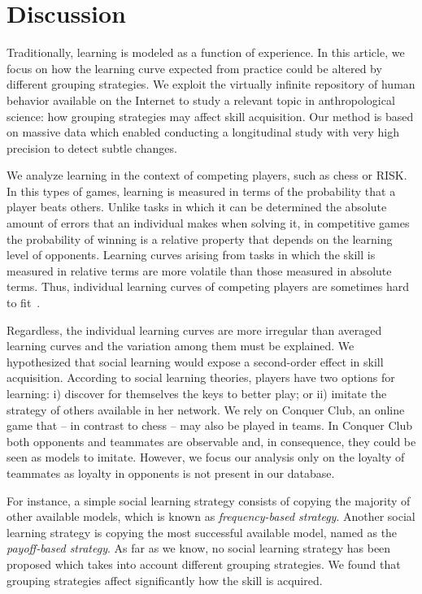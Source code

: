 \documentclass[a4paper,10pt]{book}
\theoremstyle{definition}
\begin{document}
\section{Discussion}

Traditionally, learning is modeled as a function of experience. 
In this article, we focus on how the learning curve expected from practice could be altered by different grouping strategies.
We exploit the virtually infinite repository of human behavior available on the Internet to study a relevant topic in anthropological science: how grouping strategies may affect skill acquisition.
Our method is based on massive data which enabled conducting a longitudinal study with very high precision to detect subtle changes.

We analyze learning in the context of competing players, such as chess or RISK.
In this types of games, learning is measured in terms of the probability that a player beats others.
Unlike tasks in which it can be determined the absolute amount of errors that an individual makes when solving it, in competitive games the probability of winning is a relative property that depends on the learning level of opponents.
Learning curves arising from tasks in which the skill is measured in relative terms are more volatile than those measured in absolute terms.
Thus, individual learning curves of competing players are sometimes hard to fit~\cite{howard2014-learningCurvesChessPlayersATestOfPowerLawGenerality,gaschler2014-playingOffThePredictedLearningCurve}.

Regardless, the individual learning curves are more irregular than averaged learning curves and the variation among them must be explained.
We hypothesized that social learning would expose a second-order effect in skill acquisition.
According to social learning theories, players have two options for learning: i) discover for themselves the keys to better play; or ii) imitate the strategy of others available in her network.
We rely on Conquer Club, an online game that -- in contrast to chess -- may also be played in teams.
In Conquer Club both opponents and teammates are observable and, in consequence, they could be seen as models to imitate.
However, we focus our analysis only on the loyalty of teammates as loyalty in opponents is not present in our database.

For instance, a simple social learning strategy consists of copying the majority of other available models, which is known as \emph{frequency-based strategy}.
Another social learning strategy is copying the most successful available model, named as the \emph{payoff-based strategy}.
As far as we know, no social learning strategy has been proposed which takes into account different grouping strategies.
We found that grouping strategies affect significantly how the skill is acquired.
\end{document}
